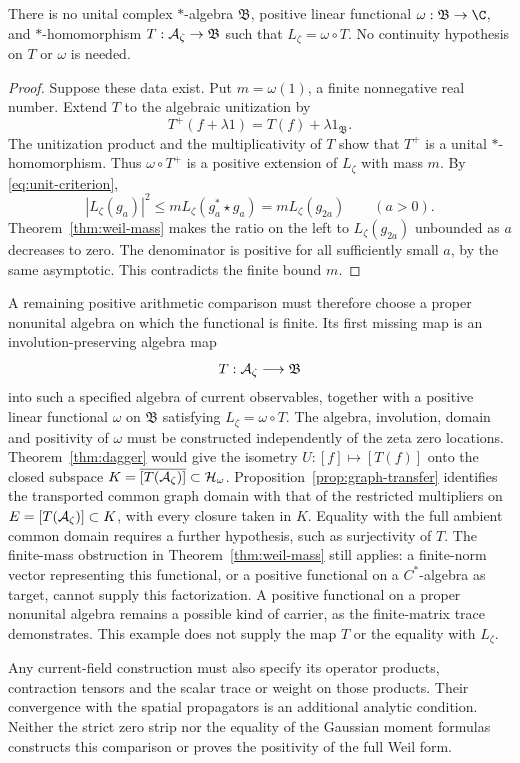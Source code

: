 \begin{proposition}
\label{prop:weil-unital-current}
There is no unital complex $*$-algebra $\mathfrak B$, positive linear
functional $\omega:\mathfrak B\to\C$, and $*$-homomorphism
$T:\mathcal A_\zeta\to\mathfrak B$ such that $L_\zeta=\omega\circ T$.
No continuity hypothesis on $T$ or $\omega$ is needed.
\end{proposition}
\begin{proof}
Suppose these data exist.  Put $m=\omega(1)$, a finite nonnegative real
number.  Extend $T$ to the algebraic unitization by
\[
 T^+(f+\lambda1)=T(f)+\lambda1_{\mathfrak B}.
\]
The unitization product and the multiplicativity of $T$ show that $T^+$
is a unital $*$-homomorphism.
Thus $\omega\circ T^+$ is a positive extension of $L_\zeta$ with mass $m$.
By \eqref{eq:unit-criterion},
\[
 |L_\zeta(g_a)|^2\leq m L_\zeta(g_a^*\star g_a)
                  =m L_\zeta(g_{2a})\qquad(a>0).
\]
Theorem~\ref{thm:weil-mass} makes the ratio on the left to
$L_\zeta(g_{2a})$ unbounded as $a$ decreases to zero.
The denominator is positive for all sufficiently small $a$, by the same
asymptotic.  This contradicts the finite bound $m$.
\end{proof}

A remaining positive arithmetic comparison must therefore choose a
proper nonunital algebra on which the functional is finite.
Its first missing map is an involution-preserving algebra map
\[
 T:\mathcal A_\zeta\longrightarrow\mathfrak B
\]
into such a specified algebra of current observables, together with a positive
linear functional $\omega$ on $\mathfrak B$ satisfying
$L_\zeta=\omega\circ T$.
The algebra, involution, domain and positivity of $\omega$ must be
constructed independently of the zeta zero locations.
Theorem~\ref{thm:dagger} would give the isometry
$U:[f]\mapsto[T(f)]$ onto the closed subspace
$K=\overline{[T(\mathcal A_\zeta)]}\subset\mathcal H_\omega$.
Proposition~\ref{prop:graph-transfer} identifies the transported common
graph domain with that of the restricted multipliers on
$E=[T(\mathcal A_\zeta)]\subset K$, with every closure taken in $K$.
Equality with the full ambient common domain requires a further
hypothesis, such as surjectivity of $T$.
The finite-mass obstruction in Theorem~\ref{thm:weil-mass} still applies:
a finite-norm vector representing this functional, or a positive
functional on a $C^*$-algebra as target, cannot supply this factorization.
A positive functional on a proper nonunital algebra remains a possible
kind of carrier, as the finite-matrix trace demonstrates.  This example
does not supply the map $T$ or the equality with $L_\zeta$.

Any current-field construction must also specify its operator products,
contraction tensors and the scalar trace or weight on those products.
Their convergence with the spatial propagators is an additional analytic
condition.  Neither the strict zero strip nor the equality of the
Gaussian moment formulas constructs this comparison or proves the
positivity of the full Weil form.

\clearpage
\endgroup
